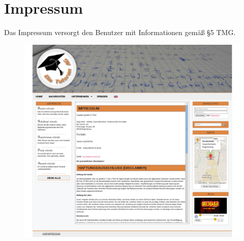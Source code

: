 
\section{Impressum}

Das Impressum versorgt den Benutzer mit Informationen gemäß §5 TMG.

\begin{figure}[!htbp]
\centering
\includegraphics[width=0.7\linewidth]{../Screenshots/de/Impressum}
\caption{}
\label{fig:Impressum}
\end{figure}
